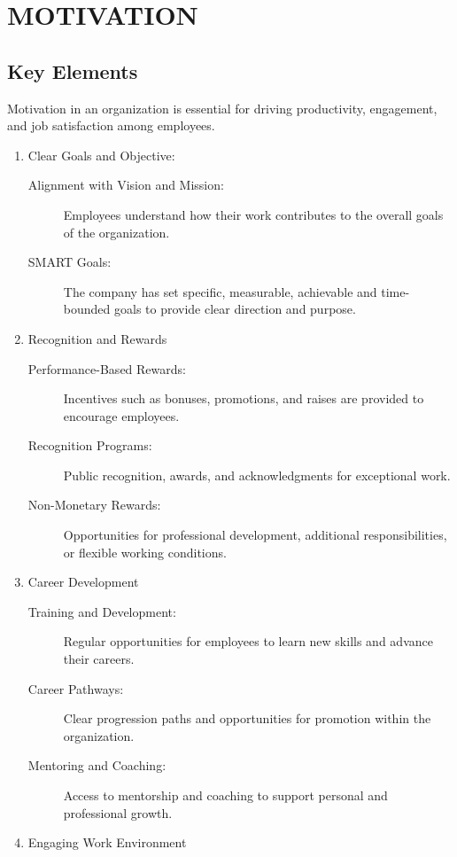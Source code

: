 
\chapter{MOTIVATION}
\section{Key Elements}
    Motivation in an organization is essential for driving productivity, engagement, and job satisfaction among employees.
    \begin{enumerate}
        \item Clear Goals and Objective:
        \begin{description}
            \item[Alignment with Vision and Mission: ] Employees understand how their work contributes to the overall goals of the organization.
            \item[SMART Goals: ] The company has set specific, measurable, achievable and time-bounded goals to provide clear direction and purpose.
        \end{description}
        \item Recognition and Rewards
        \begin{description}
            \item[Performance-Based Rewards: ] Incentives such as bonuses, promotions, and raises are provided to encourage employees.
            \item[Recognition Programs:] Public recognition, awards, and acknowledgments for exceptional work.
            \item[Non-Monetary Rewards:] Opportunities for professional development, additional responsibilities, or flexible working conditions.
        \end{description}
        \item Career Development
        \begin{description}
            \item[Training and Development:] Regular opportunities for employees to learn new skills and advance their careers.
            \item[Career Pathways:] Clear progression paths and opportunities for promotion within the organization.
            \item[Mentoring and Coaching:] Access to mentorship and coaching to support personal and professional growth. 
        \end{description}
        \item Engaging Work Environment

\end{enumerate}
